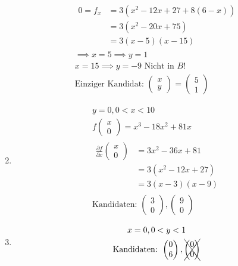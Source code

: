 \begin{bsp*}
\begin{enumerate}[label = (\alph*)]
\begin{gather*}
\begin{split}
					0 = f_x
						&= 3(x^2 - 12x + 27 + 8(6-x)) \\
						&= 3(x^2 - 20x + 75) \\
						&= 3(x-5)(x-15)
				\end{split} \\
				\implies x = 5 \implies y = 1 \\
				x = 15 \implies y = -9 \text{ Nicht in $B$!}\\
				\text{Einziger Kandidat: } \begin{pmatrix} x \\ y \end{pmatrix} = \begin{pmatrix} 5 \\ 1 \end{pmatrix}
			\end{gather*}
		\item
			\begin{gather*}
				y = 0 , 0 < x < 10 \\
				f\begin{pmatrix} x \\ 0 \end{pmatrix} = x^3 - 18x^2 + 81x \\
				\begin{split}
					\frac{\partial f}{\partial x}\begin{pmatrix} x \\ 0 \end{pmatrix}
						&= 3x^2 - 36x + 81 \\
						&= 3(x^2 - 12x + 27) \\
						&= 3(x-3)(x-9)
				\end{split} \\
				\text{Kandidaten: } \begin{pmatrix} 3 \\ 0 \end{pmatrix} , \begin{pmatrix} 9 \\ 0 \end{pmatrix}
			\end{gather*}
		\item
			\begin{gather*}
				x = 0 , 0 < y < 1 \\
				\text{Kandidaten: } \begin{pmatrix} 0 \\ 6 \end{pmatrix} , \xcancel{\begin{pmatrix} 0 \\ 0 \end{pmatrix}}

\end{gather*}
\end{enumerate}
\end{bsp*}
